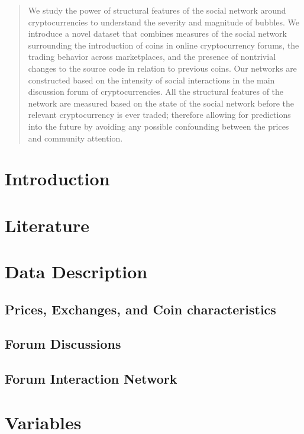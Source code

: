 \documentclass[letterpaper]{article}
\begin{document}
\begin{abstract}

We study the power of structural features of the social network around cryptocurrencies to understand the severity and magnitude of bubbles. 
We introduce a novel dataset that combines measures of the social network surrounding the introduction of coins in online cryptocurrency forums, the trading  behavior across marketplaces, and the presence of nontrivial changes to the source code in relation to previous coins.
Our networks are constructed based on the intensity of social interactions in the main discussion forum of cryptocurrencies. All the structural features of the network are measured based on the state of the social network before the relevant cryptocurrency is ever traded; therefore allowing for predictions into the future by avoiding any possible confounding between the prices and community attention.

\end{abstract}

\section{Introduction}

\section{Literature}


\section{Data Description}
\subsection{Prices, Exchanges, and Coin characteristics}

%

\subsection{Forum Discussions}


\subsection{Forum Interaction Network}



\section{Variables}
\end{document}
